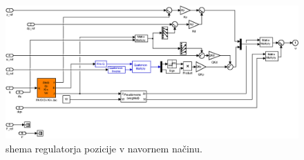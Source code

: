 \begin{figure}
	\centering
	\includegraphics[width=\textwidth]{./Slike/zunanje_koordinate_tq.eps}
	\caption{\simulink shema regulatorja pozicije v navornem na\v{c}inu.}
	\label{fig:zunanje_koordinate_tq}
\end{figure}
